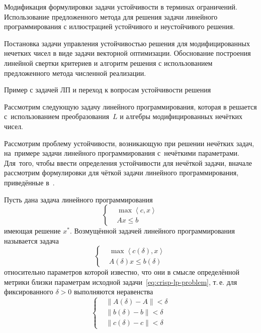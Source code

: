 Модификация формулировки задачи устойчивости в терминах ограничений. Использование предложенного метода для решения задачи линейного программирования с иллюстрацией устойчивого и неустойчивого решения. 

Постановка задачи управления устойчивостью решения для модифицированных нечетких чисел в виде задачи векторной оптимизации. Обоснование построения линейной свертки критериев и алгоритм решения с использованием предложенного метода численной реализации.

Пример с задачей ЛП и переход к вопросам устойчивости решения

Рассмотрим следующую задачу линейного программирования, которая в \cite{Vorontsov_PI} решается с~использованием преобразования~$L$ и алгебры модифицированных нечётких чисел.

Рассмотрим проблему устойчивости, возникающую при решении нечётких задач, на~примере задачи линейного программирования с~нечёткими параметрами. Для~того, чтобы ввести определения устойчивости для нечёткой задачи, вначале рассмотрим формулировки для чёткой задачи линейного программирования, приведённые в~\cite{Ashmanov}.

Пусть дана задача линейного программирования
\begin{equation}
\label{eq:crisp-lp-problem}
  \left\{ \begin{aligned}
    & \max \left\langle c,x \right\rangle \\ 
    & Ax\leqslant b
  \end{aligned} \right.
\end{equation}
имеющая решение $x^{*}$. Возмущённой задачей линейного программирования называется задача
\begin{equation}
\label{eq:crisp-lp-problem-unstable}
  \left\{ \begin{aligned}
    & \max \left\langle c\left(\delta \right),x \right\rangle \\ 
    & A\left( \delta  \right)x\leqslant b\left(\delta \right)
  \end{aligned} \right.
\end{equation}
относительно параметров которой известно, что они в смысле определённой метрики близки параметрам исходной задачи~\eqref{eq:crisp-lp-problem}, т.\,е. для фиксированного $\delta>0$ выполняются неравенства
\begin{equation}
\label{eq:delta-metric}
  \left\{ \begin{aligned}
    & \left\| A\left( \delta  \right)-A \right\|<\delta \\ 
    & \left\| b\left( \delta  \right)-b \right\|<\delta \\ 
    & \left\| c\left( \delta  \right)-c \right\|<\delta
  \end{aligned} \right.
\end{equation}

